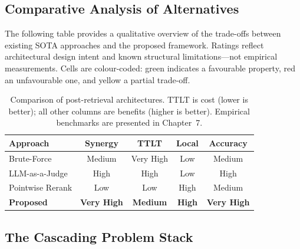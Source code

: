 \subsection{Comparative Analysis of Alternatives}
\label{subsec:comparison-table}


The following table provides a qualitative overview of the trade-offs between existing SOTA approaches and the proposed framework. Ratings reflect architectural design intent and known structural limitations—not empirical measurements. Cells are colour-coded: green indicates a favourable property, red an unfavourable one, and yellow a partial trade-off.

\begin{table}[H]
\centering
\caption{Comparison of post-retrieval architectures. TTLT is cost (lower is better); all other columns are benefits (higher is better). Empirical benchmarks are presented in Chapter~7.}
\label{tab:comparison}
\small
\setlength{\tabcolsep}{5pt}
\begin{tabular}{|l|c|c|c|c|}
\hline
\textbf{Approach} & \textbf{Synergy} & \textbf{TTLT} & \textbf{Local} & \textbf{Accuracy} \\ \hline

Brute-Force     
  & \cellcolor{cellyellow}Medium 
  & \cellcolor{cellred}Very High 
  & \cellcolor{cellred}Low 
  & \cellcolor{cellyellow}Medium \\ \hline

LLM-as-a-Judge  
  & \cellcolor{cellgreen}High 
  & \cellcolor{cellred}High 
  & \cellcolor{cellred}Low 
  & \cellcolor{cellgreen}High \\ \hline

Pointwise Rerank 
  & \cellcolor{cellred}Low 
  & \cellcolor{cellgreen}Low 
  & \cellcolor{cellgreen}High 
  & \cellcolor{cellyellow}Medium \\ \hline

\textbf{Proposed}
  & \cellcolor{cellgreen}\textbf{Very High}
  & \cellcolor{cellyellow}\textbf{Medium}
  & \cellcolor{cellgreen}\textbf{High}
  & \cellcolor{cellgreen}\textbf{Very High} \\ \hline
\end{tabular}
\end{table}




\subsection{The Cascading Problem Stack}
\label{subsec:cascading-problems}

